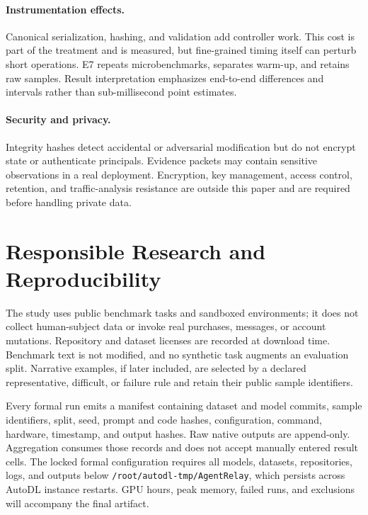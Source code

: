 \documentclass[10pt]{article}
\begin{document}
\paragraph{Instrumentation effects.}
Canonical serialization, hashing, and validation add controller work. This
cost is part of the treatment and is measured, but fine-grained timing itself
can perturb short operations. E7 repeats microbenchmarks, separates warm-up,
and retains raw samples. Result interpretation emphasizes end-to-end
differences and intervals rather than sub-millisecond point estimates.

\paragraph{Security and privacy.}
Integrity hashes detect accidental or adversarial modification but do not
encrypt state or authenticate principals. Evidence packets may contain
sensitive observations in a real deployment. Encryption, key management,
access control, retention, and traffic-analysis resistance are outside this
paper and are required before handling private data.

\section{Responsible Research and Reproducibility}
\label{sec:responsible}

The study uses public benchmark tasks and sandboxed environments; it does not
collect human-subject data or invoke real purchases, messages, or account
mutations. Repository and dataset licenses are recorded at download time.
Benchmark text is not modified, and no synthetic task augments an evaluation
split. Narrative examples, if later included, are selected by a declared
representative, difficult, or failure rule and retain their public sample
identifiers.

Every formal run emits a manifest containing dataset and model commits,
sample identifiers, split, seed, prompt and code hashes, configuration,
command, hardware, timestamp, and output hashes. Raw native outputs are
append-only. Aggregation consumes those records and does not accept manually
entered result cells. The locked formal configuration requires all models,
datasets, repositories, logs, and outputs below
\texttt{/root/autodl-tmp/AgentRelay}, which persists across AutoDL instance
restarts. GPU hours, peak memory, failed runs, and exclusions will accompany
the final artifact.
\end{document}
